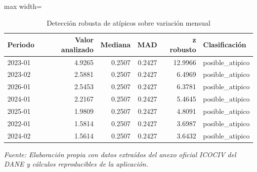 \begin{table}[H]
\centering
\caption{Detección robusta de atípicos sobre variación mensual}
\label{tab:ejemplo_outliers_vias_urbanas}
\scriptsize
\begin{adjustbox}{max width=\linewidth}
\begin{tabular}{lrrrrl}
\toprule
Periodo & Valor analizado & Mediana & MAD & z robusto & Clasificación \\
\midrule
2023-01 & 4.9265 & 0.2507 & 0.2427 & 12.9966 & posible\_atipico \\
2023-02 & 2.5881 & 0.2507 & 0.2427 & 6.4969 & posible\_atipico \\
2026-01 & 2.5453 & 0.2507 & 0.2427 & 6.3781 & posible\_atipico \\
2024-01 & 2.2167 & 0.2507 & 0.2427 & 5.4645 & posible\_atipico \\
2025-01 & 1.9809 & 0.2507 & 0.2427 & 4.8091 & posible\_atipico \\
2022-01 & 1.5814 & 0.2507 & 0.2427 & 3.6987 & posible\_atipico \\
2024-02 & 1.5614 & 0.2507 & 0.2427 & 3.6432 & posible\_atipico \\
\bottomrule
\end{tabular}
\end{adjustbox}
\par\footnotesize\textit{Fuente: Elaboración propia con datos extraídos del anexo oficial ICOCIV del DANE y cálculos reproducibles de la aplicación.}
\end{table}
